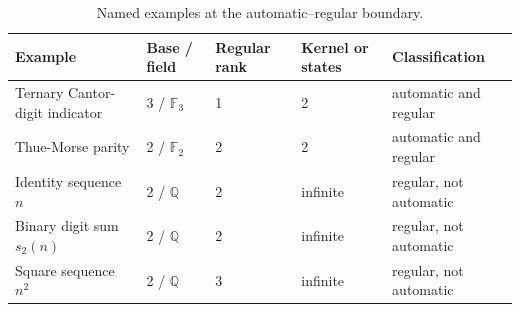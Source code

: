 \begin{table}[htbp]
\centering
\caption{Named examples at the automatic--regular boundary.}
\label{tab:block05-examples}
\small
\begin{tabularx}{\textwidth}{@{}L{0.25\textwidth}L{0.13\textwidth}L{0.11\textwidth}L{0.13\textwidth}Y@{}}
\toprule
Example & Base / field & Regular rank & Kernel or states & Classification\\
\midrule
Ternary Cantor-digit indicator & 3 / $\mathbb F_3$ & 1 & 2 & automatic and regular\\
Thue-Morse parity & 2 / $\mathbb F_2$ & 2 & 2 & automatic and regular\\
Identity sequence $n$ & 2 / $\mathbb Q$ & 2 & infinite & regular, not automatic\\
Binary digit sum $s_2(n)$ & 2 / $\mathbb Q$ & 2 & infinite & regular, not automatic\\
Square sequence $n^2$ & 2 / $\mathbb Q$ & 3 & infinite & regular, not automatic\\
\bottomrule
\end{tabularx}
\end{table}
